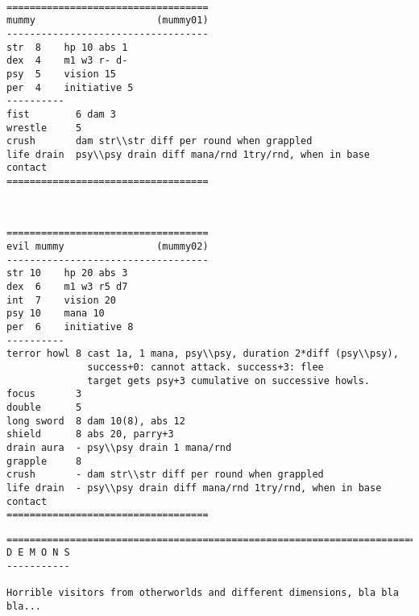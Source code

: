 \

\goodbreak \begin{samepage} \small \begin{verbatim}
===================================
mummy                     (mummy01)
-----------------------------------
str  8    hp 10 abs 1
dex  4    m1 w3 r- d-
psy  5    vision 15
per  4    initiative 5
----------
fist        6 dam 3
wrestle     5
crush       dam str\\str diff per round when grappled
life drain  psy\\psy drain diff mana/rnd 1try/rnd, when in base contact
===================================
\end{verbatim} \normalsize \end{samepage}

\

\goodbreak \begin{samepage} \small \begin{verbatim}
===================================
evil mummy                (mummy02)
-----------------------------------
str 10    hp 20 abs 3
dex  6    m1 w3 r5 d7
int  7    vision 20
psy 10    mana 10
per  6    initiative 8
----------
terror howl 8 cast 1a, 1 mana, psy\\psy, duration 2*diff (psy\\psy),
              success+0: cannot attack. success+3: flee
              target gets psy+3 cumulative on successive howls.
focus       3
double      5
long sword  8 dam 10(8), abs 12
shield      8 abs 20, parry+3
drain aura  - psy\\psy drain 1 mana/rnd
grapple     8
crush       - dam str\\str diff per round when grappled
life drain  - psy\\psy drain diff mana/rnd 1try/rnd, when in base contact
===================================
\end{verbatim} \normalsize \end{samepage}








\clearpage
{}

\goodbreak \begin{samepage} \small \begin{verbatim}
================================================================================
D E M O N S
-----------

Horrible visitors from otherworlds and different dimensions, bla bla bla...
\end{verbatim} \normalsize \end{samepage}

